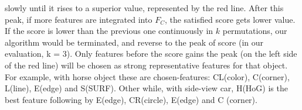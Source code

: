 slowly until it rises to a superior value, represented by the red line. After
this peak, if more features are integrated into $F_C$, the satisfied score
gets lower value.
If the score is lower than the previous one continuously in $k$ permutations, our algorithm would be terminated, and reverse to the peak of score (in our
evaluation, k = 3). Only features before the score gains the peak (on the left side of the red line) will be chosen as strong representative features for that object. For example, with horse object these are chosen-features: CL(color), C(corner), L(line), E(edge) and S(SURF). Other while, with side-view car, H(HoG) is the best feature following by E(edge), CR(circle), E(edge) and C (corner).







